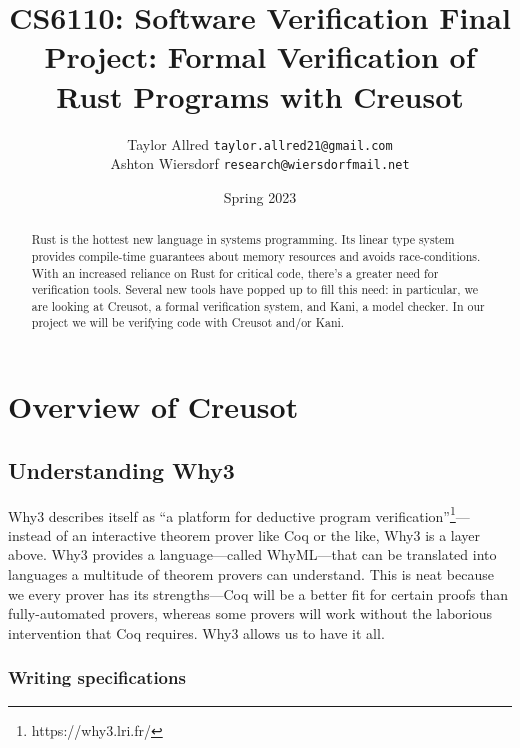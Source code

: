 \documentclass[12pt]{article}
\title{CS6110: Software Verification Final Project: Formal Verification of Rust Programs with Creusot}
\author{Taylor Allred \texttt{taylor.allred21@gmail.com}\\ Ashton Wiersdorf \texttt{research@wiersdorfmail.net}}
\date{Spring 2023}
\begin{document}
\maketitle

\begin{abstract}
\noindent
Rust is the hottest new language in systems programming.
Its linear type system provides compile-time guarantees about memory resources and avoids race-conditions.
With an increased reliance on Rust for critical code, there's a greater need for verification tools.
Several new tools have popped up to fill this need: in particular, we are looking at Creusot, a formal verification system, and Kani, a model checker.
In our project we will be verifying code with Creusot and/or Kani.
\end{abstract}

\tableofcontents

\section{Overview of Creusot}


\subsection{Understanding Why3}


Why3 describes itself as ``a platform for deductive program verification''\footnote{https://why3.lri.fr/}---instead of an interactive theorem prover like Coq or the like, Why3 is a layer above.
Why3 provides a language---called WhyML---that can be translated into languages a multitude of theorem provers can understand.
This is neat because we every prover has its strengths---Coq will be a better fit for certain proofs than fully-automated provers, whereas some provers will work without the laborious intervention that Coq requires.
Why3 allows us to have it all.

\subsubsection{Writing specifications}

\end{document}
